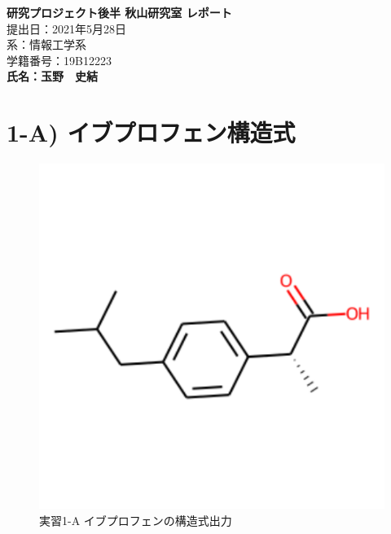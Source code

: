 \documentclass[a4j,11pt]{jarticle}
\begin{document}
\begin{center}
\vspace{10mm}
{\bf {\huge 研究プロジェクト後半 秋山研究室 レポート}}\\
\vspace{80mm}
提出日：2021年5月28日\\
\vspace{10mm}
系：情報工学系\\
\vspace{10mm}
学籍番号：19B12223\\
\vspace{10mm}
\vspace{20mm}
{\bf {\LARGE 氏名：玉野　史結}}
\end{center}
\newpage
\section{1-A) イブプロフェン構造式}
\begin{figure}[H]
\centering
\includegraphics[scale=0.5]{./images/exercise_A_Ibuprofen.pdf}
\caption{実習1-A イブプロフェンの構造式出力}
\label{fig:ex1_A}
\end{figure}
\end{document}

